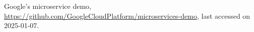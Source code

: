 \documentclass{article}
\begin{document}
\begin{thebibliography}{10}


 Google's microservice demo, \url{https://github.com/GoogleCloudPlatform/microservices-demo}, last accessed on 2025-01-07.




\end{thebibliography}
\end{document}
